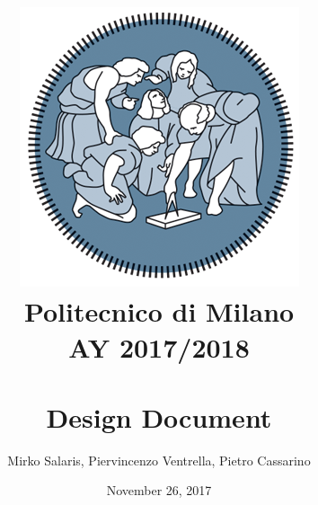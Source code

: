 \begin{titlepage}

\title{
	\includegraphics[scale=0.5]{Images/PolimiLogo}
	\\
	\normalsize{Politecnico di Milano}\\
	{AY 2017/2018}
	\bigskip\\
	\bigskip\\
	\LARGE{Design Document}
	\vfill
}

	\date{November 26, 2017}

\author{
	Mirko Salaris,
	Piervincenzo Ventrella,
	Pietro Cassarino
}

\maketitle
\thispagestyle{empty}

\end{titlepage}